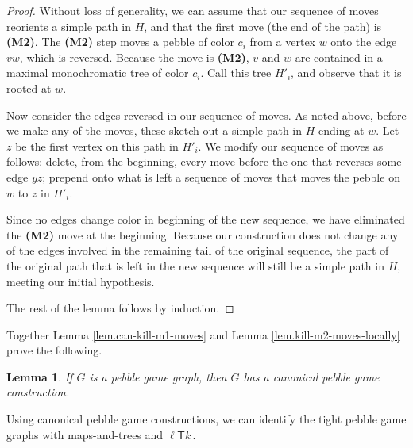 \documentclass[11pt]{article}
\newcommand{\ellteekay}{\ensuremath{\ell{\mathsf T}k}\,}
\newtheorem{lemma}[theorem]{Lemma}
\newcommand{\reflem}[1]{Lemma \ref{lem.#1}}
\newcommand{\labellem}[1]{\label{lem.#1}}
\begin{document}
	\begin{proof}
	Without loss of generality, we can assume that our sequence of moves reorients a 
	simple path in $H$, and that the first move (the end of the path)
	is {\bf (M2)}.  The {\bf (M2)} step moves a pebble 
	of color $c_i$ from a vertex $w$ onto the edge $vw$, which is reversed.  Because the move
	is {\bf (M2)}, $v$ and $w$ are contained in a maximal monochromatic tree of color $c_i$.
	Call this tree $H'_i$, and observe that it is rooted at $w$.
	
	Now consider the edges reversed in our sequence of moves.  As noted above, before we make
	any of the moves, these sketch out a simple path in $H$ ending at $w$.  Let $z$ be the 
	first vertex on this path in $H'_i$.  We modify our sequence of moves as follows: delete,
	from the beginning, every move before the one that reverses some edge $yz$; prepend onto
	what is left a sequence of moves that moves the pebble on $w$ to $z$ in $H'_i$.  
	
	Since no edges change color in beginning of the new sequence, we have eliminated
	the {\bf (M2)} move at the beginning.  Because our construction does not change 
	any of the edges involved in the remaining tail of the original sequence, the 
	part of the original path that is left in the new sequence will still be 
	a simple path in $H$, meeting our initial hypothesis.
	
	The rest of the lemma follows by induction.
	\end{proof}
	
	Together \reflem{can-kill-m1-moves} and \reflem{kill-m2-moves-locally} prove the following. 
	\begin{lemma}
		If $G$ is a pebble game graph, then $G$ has a canonical pebble game construction. 
		\labellem{canonical-constructions-exist} 
	\end{lemma}
	
	Using canonical pebble game constructions, we can identify 
	the tight pebble game graphs with maps-and-trees and \ellteekay. 
	
\end{document}

